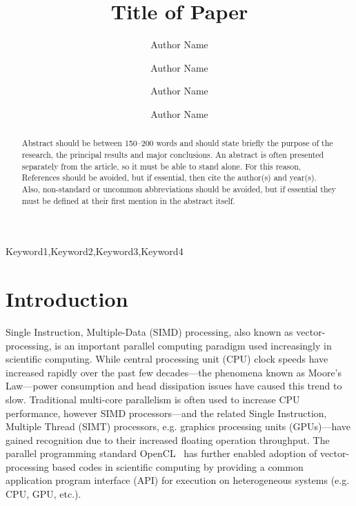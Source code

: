 \documentclass[12pt]{ussci}
\title{ Title of Paper }
\author[1]{Author Name}
\author[1]{Author Name}
\author[2]{Author Name}
\author[2,*]{Author Name}
\affil[1]{Department, Institution, Address, Country}
\affil[2]{Department, Institution, Address, Country}
\affil[*]{Corresponding author: \email{author@university.edu}}
\begin{document}
\maketitle

\begin{abstract} %
Abstract should be between 150--200 words and should state briefly the purpose
of the research, the principal results and major conclusions. An abstract is
often presented separately from the article, so it must be able to stand alone.
For this reason, References should be avoided, but if essential, then cite the
author(s) and year(s). Also, non-standard or uncommon abbreviations should be
avoided, but if essential they must be defined at their first mention in the
abstract itself.
\end{abstract}

\begin{keyword}
    Keyword1\sep Keyword2\sep Keyword3\sep Keyword4
\end{keyword}

\section{Introduction}
%

Single Instruction, Multiple-Data (SIMD) processing, also known as vector-processing, is an important parallel computing paradigm used increasingly in scientific computing.
While central processing unit (CPU) clock speeds have increased rapidly over the past few decades---the phenomena known as Moore's Law---power consumption and head dissipation issues have caused this trend to slow.
Traditional multi-core parallelism is often used to increase CPU performance, however SIMD processors---and the related Single Instruction, Multiple Thread (SIMT) processors, e.g. graphics processing units (GPUs)---have gained recognition due to their increased floating operation throughput.
The parallel programming standard OpenCL~\cite{stone2010opencl} has further enabled adoption of vector-processing based codes in scientific computing by providing a common application program interface (API) for execution on heterogeneous systems (e.g. CPU, GPU, etc.).
\end{document}
